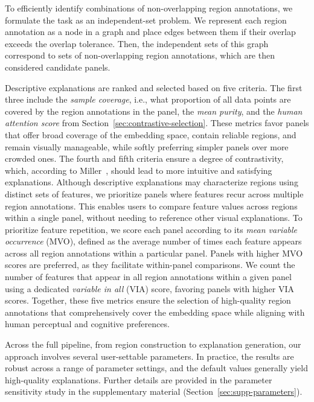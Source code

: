 \documentclass[lettersize,journal]{IEEEtran}
\begin{document}
To efficiently identify combinations of non-overlapping region annotations, we formulate the task as an independent-set problem. We represent each region annotation as a node in a graph and place edges between them if their overlap exceeds the overlap tolerance. Then, the independent sets of this graph correspond to sets of non-overlapping region annotations, which are then considered candidate panels.

Descriptive explanations are ranked and selected based on five criteria.
The first three include the \textit{sample coverage}, i.e., what proportion of all data points are covered by the region annotations in the panel, the \textit{mean purity}, and the \textit{human attention score} from Section~\ref{sec:contrastive-selection}.
These metrics favor panels that offer broad coverage of the embedding space, contain reliable regions, and remain visually manageable, while softly preferring simpler panels over more crowded ones.
The fourth and fifth criteria ensure a degree of contrastivity, which, according to Miller~\cite{Miller2019}, should lead to more intuitive and satisfying explanations.
Although descriptive explanations may characterize regions using distinct sets of features, we prioritize panels where features recur across multiple region annotations. This enables users to compare feature values across regions within a single panel, without needing to reference other visual explanations.
To prioritize feature repetition, we score each panel according to its \textit{mean variable occurrence} (MVO), defined as the average number of times each feature appears across all region annotations within a particular panel.
Panels with higher MVO scores are preferred, as they facilitate within-panel comparisons.
We count the number of features that appear in all region annotations within a given panel using a dedicated \textit{variable in all} (VIA) score, favoring panels with higher VIA scores.
Together, these five metrics ensure the selection of high-quality region annotations that comprehensively cover the embedding space while aligning with human perceptual and cognitive preferences.

Across the full pipeline, from region construction to explanation generation, our approach involves several user-settable parameters. In practice, the results are robust across a range of parameter settings, and the default values generally yield high-quality explanations. Further details are provided in the parameter sensitivity study in the supplementary material (Section~\ref{sec:supp-parameters}).
\end{document}
